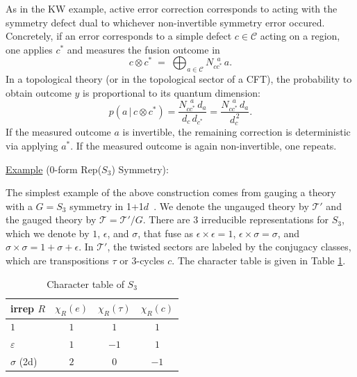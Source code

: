 \documentclass{article}
\theoremstyle{definition}
\begin{document}
  As in the KW example, active error correction corresponds to acting with the
  symmetry defect dual to whichever non-invertible symmetry error occured. Concretely,
  if an error corresponds to a simple defect $c\in\mathcal{C}$ acting on a
  region, one applies $c^{*}$ and measures the fusion outcome in
  \begin{equation}
    \label{eq:fusion-measurement-general}c\otimes c^{*}\;=\;\bigoplus_{a\in\mathcal{C}}
    N_{cc^*}^{\;\;a}\,a.
  \end{equation}
  In a topological theory (or in the topological sector of a CFT), the
  probability to obtain outcome $y$ is proportional to its quantum dimension:
  \begin{equation}
    \label{eq:fusion-prob}p(a\,|\,c\otimes c^{*})=\frac{N_{cc^*}^{\;\;a}\,d_{a}}{d_{c}\,d_{c^*}}
    =\frac{N_{cc^*}^{\;\;a}\,d_{a}}{d_{c}^{\,2}}.
  \end{equation}
  If the measured outcome $a$ is invertible, the remaining correction is
  deterministic via applying $a^{*}$. If the measured outcome is again non-invertible,
  one repeats.

  \underline{Example} (0-form Rep($S_{3}$) Symmetry):

  The simplest example of the above construction comes from gauging a theory
  with a $G = S_{3}$ symmetry in 1+1$d$~\cite{bhardwaj2025gappedphaseswithnoninvertiblesymm}.
  We denote the ungauged theory by $\mathcal{T}'$ and the gauged theory by
  $\mathcal{T}= \mathcal{T'}/G$. There are 3 irreducible representations for $S_{3}$,
  which we denote by $1$, $\epsilon$, and $\sigma$, that fuse as $\epsilon \times
  \epsilon = 1$, $\epsilon \times \sigma = \sigma$, and $\sigma \times \sigma = 1
  + \sigma + \epsilon$. In $\mathcal{T}'$, the twisted sectors are labeled by the
  conjugacy classes, which are transpositions $\tau$ or 3-cycles $c$. The character
  table is given in Table \ref{tab:s3chartable}.

  \begin{table}[h]
    \centering
    \begin{tabular}{lccc}
      \hline
      irrep $R$     & $\chi_{R}(e)$ & $\chi_{R}(\tau)$ & $\chi_{R}(c)$ \\
      \hline
      $1$           & $1$           & $1$              & $1$           \\
      $\varepsilon$ & $1$           & $-1$             & $1$           \\
      $\sigma$ (2d) & $2$           & $0$              & $-1$          \\
      \hline
    \end{tabular}
    \caption{Character table of $S_{3}$}
    \label{tab:s3chartable}
  \end{table}
\end{document}
